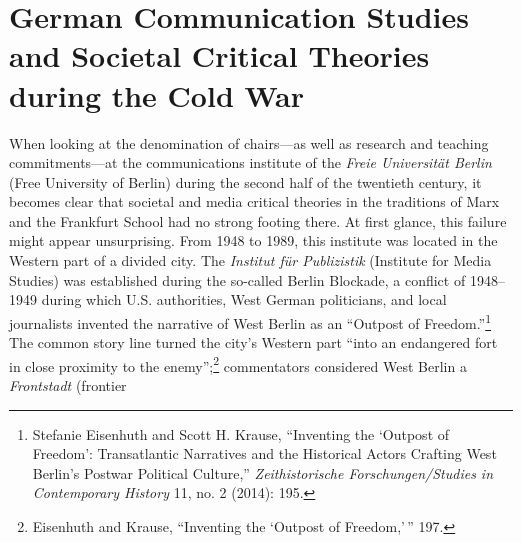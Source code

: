 \documentclass{tufte-handout}
\begin{document}
\begin{titlepage}
\begin{fullwidth}
\end{fullwidth}

\vspace*{1em}


\hypertarget{german-communication-studies-and-societal-critical-theories-during-the-cold-war}{%
\section{German Communication Studies and Societal Critical Theories
\\\noindent during the Cold
War}}\label{german-communication-studies-and-societal-critical-theories-during-the-cold-war}

When looking at the denomination of chairs---as well as research and
teaching commitments---at the communications institute of the
\emph{Freie Universität Berlin} (Free University of Berlin) during the
second half of the twentieth century, it becomes clear that societal and
media critical theories in the traditions of Marx and the Frankfurt
School had no strong footing there. At first glance, this failure might
appear unsurprising. From 1948 to 1989, this institute was located in
the Western part of a divided city. The \emph{Institut für Publizistik}
(Institute for Media Studies) was established during the so-called
Berlin Blockade, a conflict of 1948--1949 during which U.S. authorities,
West German politicians, and local journalists invented the narrative of
West Berlin as an ``Outpost of Freedom.''\footnote{Stefanie Eisenhuth
  and Scott H. Krause, ``Inventing the `Outpost of Freedom':
  Transatlantic Narratives and the Historical Actors Crafting West
  Berlin's Postwar Political Culture,'' \emph{Zeithistorische
  Forschungen/Studies in Contemporary History} 11, no. 2 (2014): 195.}
The common story line turned the city's Western part ``into an
endangered fort in close proximity to the enemy'';\footnote{Eisenhuth
  and Krause, ``Inventing the `Outpost of Freedom,'\,'' 197.}
commentators considered West Berlin a \emph{Frontstadt} (frontier

\enlargethispage{2\baselineskip}

\vspace*{2em}





 \end{titlepage}
\end{document}
